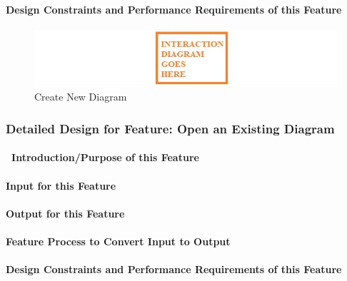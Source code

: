\documentclass[twoside,letterpaper]{article}
\begin{document}
{{}

\paragraph{Design Constraints and Performance Requirements of this Feature}
{

}
\bigskip

\begin{figure}[h]
\centering
\includegraphics[width=6.0in]{temp.jpg}
\caption{Create New Diagram}
\end{figure}
\clearpage



% 
%

\subsubsection{Detailed Design for Feature: Open an Existing Diagram }
\paragraph[\ Introduction/Purpose of this Feature]
{\ Introduction/Purpose of this Feature}
{

}

\paragraph[Input for this Feature]{Input for this Feature}
{

}

\paragraph{Output for this Feature}
{

}

\paragraph{Feature Process to Convert Input to Output}
{

}

\paragraph{Design Constraints and Performance Requirements of this Feature}
{

}}
\end{document}
